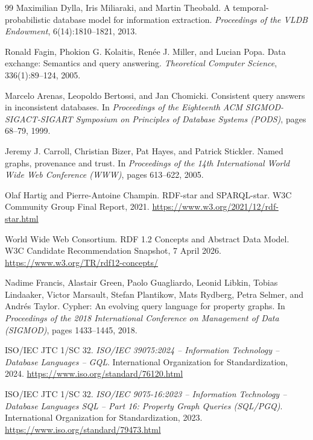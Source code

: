 \documentclass[a4paper,fleqn]{cas-sc}
\theoremstyle{plain}
\theoremstyle{remark}
\begin{document}
\begin{thebibliography}{99}
Maximilian Dylla, Iris Miliaraki, and Martin Theobald.
\newblock A temporal-probabilistic database model for information extraction.
\newblock \emph{Proceedings of the VLDB Endowment}, 6(14):1810--1821, 2013.

Ronald Fagin, Phokion G. Kolaitis, Ren{\'e}e J. Miller, and Lucian Popa.
\newblock Data exchange: Semantics and query answering.
\newblock \emph{Theoretical Computer Science}, 336(1):89--124, 2005.

Marcelo Arenas, Leopoldo Bertossi, and Jan Chomicki.
\newblock Consistent query answers in inconsistent databases.
\newblock In \emph{Proceedings of the Eighteenth ACM SIGMOD-SIGACT-SIGART Symposium on Principles of Database Systems (PODS)}, pages 68--79, 1999.

Jeremy J. Carroll, Christian Bizer, Pat Hayes, and Patrick Stickler.
\newblock Named graphs, provenance and trust.
\newblock In \emph{Proceedings of the 14th International World Wide Web Conference (WWW)}, pages 613--622, 2005.

Olaf Hartig and Pierre-Antoine Champin.
\newblock RDF-star and SPARQL-star.
\newblock W3C Community Group Final Report, 2021.
\newblock \url{https://www.w3.org/2021/12/rdf-star.html}

World Wide Web Consortium.
\newblock RDF 1.2 Concepts and Abstract Data Model.
\newblock W3C Candidate Recommendation Snapshot, 7 April 2026.
\newblock \url{https://www.w3.org/TR/rdf12-concepts/}

Nadime Francis, Alastair Green, Paolo Guagliardo, Leonid Libkin, Tobias Lindaaker, Victor Marsault, Stefan Plantikow, Mats Rydberg, Petra Selmer, and Andr{\'e}s Taylor.
\newblock Cypher: An evolving query language for property graphs.
\newblock In \emph{Proceedings of the 2018 International Conference on Management of Data (SIGMOD)}, pages 1433--1445, 2018.

ISO/IEC JTC 1/SC 32.
\newblock \emph{ISO/IEC 39075:2024 -- Information Technology -- Database Languages -- GQL}.
\newblock International Organization for Standardization, 2024.
\newblock \url{https://www.iso.org/standard/76120.html}

ISO/IEC JTC 1/SC 32.
\newblock \emph{ISO/IEC 9075-16:2023 -- Information Technology -- Database Languages SQL -- Part 16: Property Graph Queries (SQL/PGQ)}.
\newblock International Organization for Standardization, 2023.
\newblock \url{https://www.iso.org/standard/79473.html}


\end{thebibliography}
\end{document}
